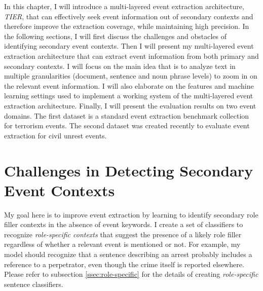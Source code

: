   
 In this chapter, I will introduce a multi-layered event extraction architecture, {\it TIER}, that 
can effectively seek event information out of secondary contexts and therefore improve 
the extraction coverage, while maintaining high precision.
In the following sections, I will first discuss the challenges and obstacles 
of identifying secondary event contexts.  Then I will present my multi-layered 
event extraction architecture that can extract event information from both 
primary and secondary contexts. I will focus on the main idea 
that is to analyze text in multiple 
granularities (document, sentence and noun phrase levels) to zoom in on the 
relevant event information. I will also elaborate on the features 
and machine learning settings used to implement a working system of the multi-layered 
event extraction architecture.
Finally, I will present the evaluation results on two event domains. 
The first dataset is a standard event extraction benchmark collection for terrorism events.
The second dataset was created recently 
to evaluate event extraction for civil unrest events. 

\section{Challenges in Detecting Secondary Event Contexts}
\label{secondary}
My goal here is to improve event extraction by learning to
identify secondary role filler contexts in the absence of event keywords.
I create a set of  classifiers to recognize {\it role-specific
contexts} that suggest the presence of a likely role filler regardless
of whether a relevant event is mentioned or not. For example, my model
should recognize that a sentence describing an arrest probably
includes a reference to a perpetrator, even though the  crime itself
is reported elsewhere. Please refer to 
subsection \ref{ssec:role-specific} for the details 
of creating {\it role-specific} sentence classifiers. 


